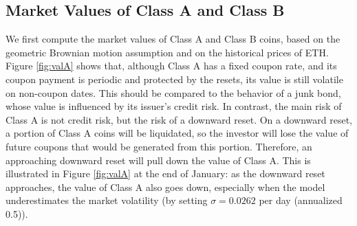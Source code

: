 \documentclass[draft, noinfoline]{ectaart}
\numberwithin{equation}{section}
\theoremstyle{plain}
\begin{document}
%
%
%
%

\subsection{Market Values of Class A and Class B}


We first compute the market values of Class A and Class B coins, based on the geometric Brownian motion assumption and on the historical prices of ETH. Figure \ref{fig:valA} shows that, although Class A has a fixed coupon rate, and its coupon payment is periodic and protected by the resets, its value is still volatile on non-coupon dates. This should be compared to the behavior of a junk bond, whose value is influenced by its issuer's credit risk. In contrast, the main risk of Class A is not credit risk, but the risk of a downward reset. On a downward reset, a portion of Class A coins will be liquidated, so the investor will lose the value of future coupons that would be generated from this portion. Therefore, an approaching downward reset will pull down the value of Class A. This is illustrated in Figure \ref{fig:valA} at the end of January: as the downward reset approaches, the value of Class A also goes down, especially when the model underestimates the market volatility (by setting $\sigma=0.0262$ per day (annualized 0.5)).
\end{document}
